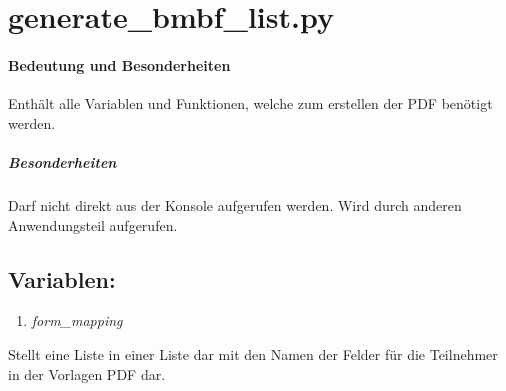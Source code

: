 \documentclass[12pt,parskip=full, pagea4]{scrreprt}
\begin{document}
			\leftskip=0cm

			\section{generate\_bmbf\_list.py}
			\paragraph{Bedeutung und Besonderheiten}Enth\"alt alle Variablen und Funktionen, welche zum erstellen der PDF ben\"otigt werden.
			\subparagraph{Besonderheiten}Darf nicht direkt aus der Konsole aufgerufen werden. Wird durch anderen Anwendungsteil aufgerufen.
			\subsection{Variablen:}
			\begin{enumerate}
				\item \textit{form\_mapping} 
			\end{enumerate}
			\leftskip=1.5cm Stellt eine Liste in einer Liste dar mit den Namen der Felder f\"ur die Teilnehmer in der Vorlagen PDF dar.
\end{document}
